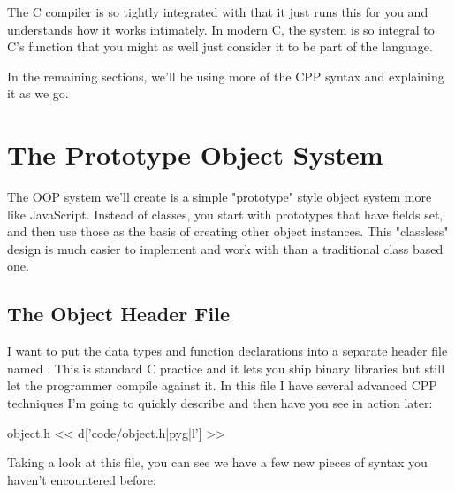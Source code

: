 The C compiler is so tightly integrated with  that it just
runs this for you and understands how it works intimately.  In modern C,
the  system is so integral to C's function that you might
as well just consider it to be part of the language.

In the remaining sections, we'll be using more of the CPP syntax and explaining
it as we go.


\section{The Prototype Object System}

The OOP system we'll create is a simple "prototype" style object system more
like JavaScript.  Instead of classes, you start with prototypes that have
fields set, and then use those as the basis of creating other object instances.
This "classless" design is much easier to implement and work with than a
traditional class based one.

\subsection{The Object Header File}

I want to put the data types and function declarations into a separate
header file named .  This is standard C practice and it
lets you ship binary libraries but still let the programmer compile against
it.  In this file I have several advanced CPP techniques I'm going to
quickly describe and then have you see in action later:

\begin{code}{object.h}
<< d['code/object.h|pyg|l'] >>
\end{code}

Taking a look at this file, you can see we have a few new pieces of 
syntax you haven't encountered before:

